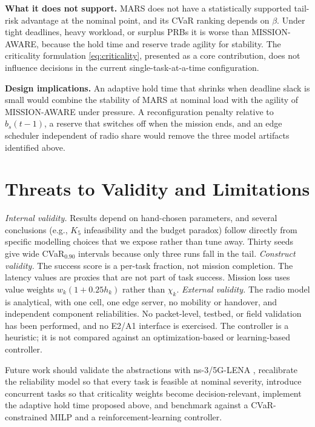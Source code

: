 \documentclass[conference]{IEEEtran}
\begin{document}
\textbf{What it does not support.} MARS does not have a statistically supported tail-risk advantage at the nominal point, and its CVaR ranking depends on $\beta$. Under tight deadlines, heavy workload, or surplus PRBs it is worse than MISSION-AWARE, because the hold time and reserve trade agility for stability. The criticality formulation \eqref{eq:criticality}, presented as a core contribution, does not influence decisions in the current single-task-at-a-time configuration.

\textbf{Design implications.} An adaptive hold time that shrinks when deadline slack is small would combine the stability of MARS at nominal load with the agility of MISSION-AWARE under pressure. A reconfiguration penalty relative to $b_s(t-1)$, a reserve that switches off when the mission ends, and an edge scheduler independent of radio share would remove the three model artifacts identified above.

\section{Threats to Validity and Limitations}
\emph{Internal validity.} Results depend on hand-chosen parameters, and several conclusions (e.g., $K_5$ infeasibility and the budget paradox) follow directly from specific modelling choices that we expose rather than tune away. Thirty seeds give wide CVaR$_{0.90}$ intervals because only three runs fall in the tail.
\emph{Construct validity.} The success score is a per-task fraction, not mission completion. The latency values are proxies that are not part of task success. Mission loss uses value weights $w_k(1+0.25h_k)$ rather than $\chi_k$.
\emph{External validity.} The radio model is analytical, with one cell, one edge server, no mobility or handover, and independent component reliabilities. No packet-level, testbed, or field validation has been performed, and no E2/A1 interface is exercised. The controller is a heuristic; it is not compared against an optimization-based or learning-based controller.

Future work should validate the abstractions with ns-3/5G-LENA \cite{lena}, recalibrate the reliability model so that every task is feasible at nominal severity, introduce concurrent tasks so that criticality weights become decision-relevant, implement the adaptive hold time proposed above, and benchmark against a CVaR-constrained MILP and a reinforcement-learning controller.
\end{document}
